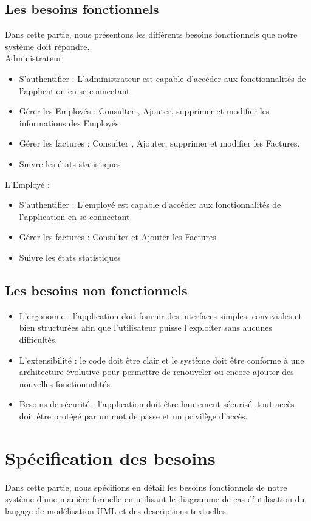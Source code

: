 \documentclass[12pt]{report}
\begin{document}
\subsection{Les besoins fonctionnels}
Dans cette partie, nous présentons les différents besoins fonctionnels que notre système doit répondre.\\
Administrateur:
\begin{itemize}[label={$\bullet$}]
	\item S'authentifier : L'administrateur est capable d'accéder aux fonctionnalités de l'application en se connectant.
	\item Gérer les Employés : Consulter , Ajouter, supprimer et modifier les informations des Employés.
	\item Gérer les factures : Consulter , Ajouter, supprimer et modifier les Factures.
	\item Suivre les états statistiques 
\end{itemize}
\vspace{10pt}
L'Employé :
\begin{itemize}[label={$\bullet$}]
	\item S'authentifier : L'employé est capable d'accéder aux fonctionnalités de l'application en se connectant.
	\item Gérer les factures : Consulter et Ajouter les Factures.
	\item Suivre les états statistiques 
\end{itemize}

\subsection{Les besoins non fonctionnels}
\begin{itemize}[label={$\bullet$}]
	\item L'ergonomie : l'application doit fournir des interfaces simples, conviviales et bien structurées afin que l'utilisateur puisse l'exploiter sans aucunes difficultés.
	\item L'extensibilité : le code doit être clair et le système doit être conforme à une architecture évolutive pour permettre de renouveler ou encore ajouter des nouvelles fonctionnalités.
	\item Besoins de sécurité : l'application doit être hautement sécurisé ,tout accès doit être protégé par un mot de passe et un privilège d'accès.
\end{itemize}
\section{Spécification des besoins}
Dans cette partie, nous spécifions en détail les besoins fonctionnels de notre système d'une manière formelle en utilisant le diagramme de cas d'utilisation du langage de modélisation UML et des descriptions textuelles.
\end{document}
